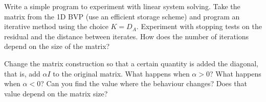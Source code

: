     Write a simple program to experiment with linear system
    solving. Take the matrix from the 1D BVP (use an efficient storage
    scheme) and program an iterative
    method using the choice $K=D_A$. Experiment with stopping tests on
    the residual and the distance between iterates.
    How does the number of iterations
    depend on the size of the matrix?

    Change the matrix construction so that a certain quantity is
    added the diagonal, that is, add $\alpha I$ to the original
    matrix. What happens when $\alpha>0$? What happens when
    $\alpha<0$? Can you find the value where the behaviour changes?
    Does that value depend on the matrix size?
